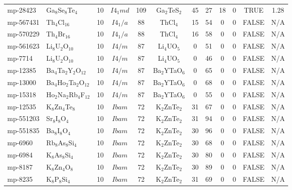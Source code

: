 {\begin{longtable}{llcccccccccc}
    mp-28423 & Ga$_{8}$Se$_{8}$Te$_{4}$ & 10    & $I4_1md$ & 109   & Ga$_{2}$TeS$_{2}$ & 45    & 27    & 18    & 0     & TRUE  & 1.28  \\
    mp-567431 & Th$_{4}$Cl$_{16}$ & 10    & $I4_1/a$ & 88    & ThCl$_{4}$ & 15    & 54    & 0     & 0     & FALSE & N/A \\
    mp-570229 & Th$_{4}$Br$_{16}$ & 10    & $I4_1/a$ & 88    & ThCl$_{4}$ & 16    & 58    & 0     & 0     & FALSE & N/A \\
    mp-561623 & Li$_{8}$U$_{2}$O$_{10}$ & 10    & $I4/m$ & 87    & Li$_{4}$UO$_{5}$ & 0     & 51    & 0     & 0     & FALSE & N/A \\
    mp-7714 & Li$_{8}$U$_{2}$O$_{10}$ & 10    & $I4/m$ & 87    & Li$_{4}$UO$_{5}$ & 0     & 46    & 0     & 0     & FALSE & N/A \\
    mp-12385 & Ba$_{4}$Ta$_{2}$Y$_{2}$O$_{12}$ & 10    & $I4/m$ & 87    & Ba$_{2}$YTaO$_{6}$ & 0     & 65    & 0     & 0     & FALSE & N/A \\
    mp-13000 & Ba$_{4}$Ho$_{2}$Ta$_{2}$O$_{12}$ & 10    & $I4/m$ & 87    & Ba$_{2}$YTaO$_{6}$ & 0     & 68    & 0     & 0     & FALSE & N/A \\
    mp-15318 & Ho$_{2}$Na$_{2}$Rb$_{4}$F$_{12}$ & 10    & $I4/m$ & 87    & Ba$_{2}$YTaO$_{6}$ & 0     & 55    & 0     & 0     & FALSE & N/A \\
    mp-12535 & K$_{8}$Zn$_{4}$Te$_{8}$ & 10    & $Ibam$ & 72    & K$_{2}$ZnTe$_{2}$ & 31    & 67    & 0     & 0     & FALSE & N/A \\
    mp-551203 & Sr$_{8}$I$_{8}$O$_{4}$ & 10    & $Ibam$ & 72    & K$_{2}$ZnTe$_{2}$ & 31    & 94    & 0     & 0     & FALSE & N/A \\
    mp-551835 & Ba$_{8}$I$_{8}$O$_{4}$ & 10    & $Ibam$ & 72    & K$_{2}$ZnTe$_{2}$ & 30    & 96    & 0     & 0     & FALSE & N/A \\
    mp-6960 & Rb$_{8}$As$_{8}$Si$_{4}$ & 10    & $Ibam$ & 72    & K$_{2}$ZnTe$_{2}$ & 30    & 68    & 0     & 0     & FALSE & N/A \\
    mp-6984 & K$_{8}$As$_{8}$Si$_{4}$ & 10    & $Ibam$ & 72    & K$_{2}$ZnTe$_{2}$ & 30    & 80    & 0     & 0     & FALSE & N/A \\
    mp-8187 & K$_{8}$Zn$_{4}$O$_{8}$ & 10    & $Ibam$ & 72    & K$_{2}$ZnTe$_{2}$ & 30    & 89    & 0     & 0     & FALSE & N/A \\
    mp-8235 & K$_{8}$P$_{8}$Si$_{4}$ & 10    & $Ibam$ & 72    & K$_{2}$ZnTe$_{2}$ & 31    & 69    & 0     & 0     & FALSE & N/A \\

\end{longtable}}
